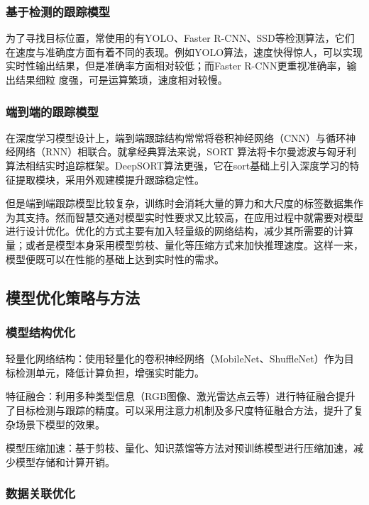 \subsubsection{基于检测的跟踪模型}

为了寻找目标位置，常使用的有YOLO、Faster R-CNN、SSD等检测算法，它们在速度与准确度方面有着不同的表现。例如YOLO算法，速度快得惊人，可以实现实时性输出结果，但是准确率方面相对较低；而Faster R-CNN更重视准确率，输出结果细粒 度强，可是运算繁琐，速度相对较慢。


\subsubsection{端到端的跟踪模型}


在深度学习模型设计上，端到端跟踪结构常常将卷积神经网络（CNN）与循环神经网络（RNN）相联合。就拿经典算法来说，SORT 算法将卡尔曼滤波与匈牙利算法相结实时追踪框架。DeepSORT算法更强，它在sort基础上引入深度学习的特征提取模块，采用外观建模提升跟踪稳定性。

但是端到端跟踪模型比较复杂，训练时会消耗大量的算力和大尺度的标签数据集作为其支持。然而智慧交通对模型实时性要求又比较高，在应用过程中就需要对模型进行设计优化。优化的方式主要有加入轻量级的网络结构，减少其所需要的计算量；或者是模型本身采用模型剪枝、量化等压缩方式来加快推理速度。这样一来，模型便既可以在性能的基础上达到实时性的需求。


\subsection{模型优化策略与方法}

\subsubsection{模型结构优化}

轻量化网络结构：使用轻量化的卷积神经网络（MobileNet、ShuffleNet）作为目标检测单元，降低计算负担，增强实时能力。

特征融合：利用多种类型信息（RGB图像、激光雷达点云等）进行特征融合提升了目标检测与跟踪的精度。可以采用注意力机制及多尺度特征融合方法，提升了复杂场景下模型的效果。

模型压缩加速：基于剪枝、量化、知识蒸馏等方法对预训练模型进行压缩加速，减少模型存储和计算开销。

\subsubsection{数据关联优化}

